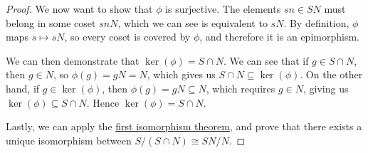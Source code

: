 \begin{proof}
    We now want to show that \(\phi\) is surjective.
    The elements \(sn \in SN\) must belong in some coset \(snN\),
    which we can see is equivalent to \(sN\).
    By definition, \(\phi\) maps \(s \mapsto sN\),
    so every coset is covered by \(\phi\),
    and therefore it is an epimorphism.

    We can then demonstrate that \(\ker(\phi) = S \cap N\).
    We can see that if \(g \in S \cap N\),
    then \(g \in N\), so \(\phi(g) = gN = N\),
    which gives us \(S \cap N \subseteq \ker(\phi)\).
    On the other hand, if \(g \in \ker(\phi)\),
    then \(\phi(g) = gN \subseteq N\),
    which requires \(g \in N\),
    giving us \(\ker(\phi) \subseteq S \cap N\).
    Hence \(\ker(\phi) = S \cap N\).

    Lastly, we can apply the
    \hyperref[thm:iso-1-group]{first isomorphism theorem},
    and prove that there exists a unique isomorphism
    between \(S/(S \cap N) \cong SN/N\).
\end{proof}

